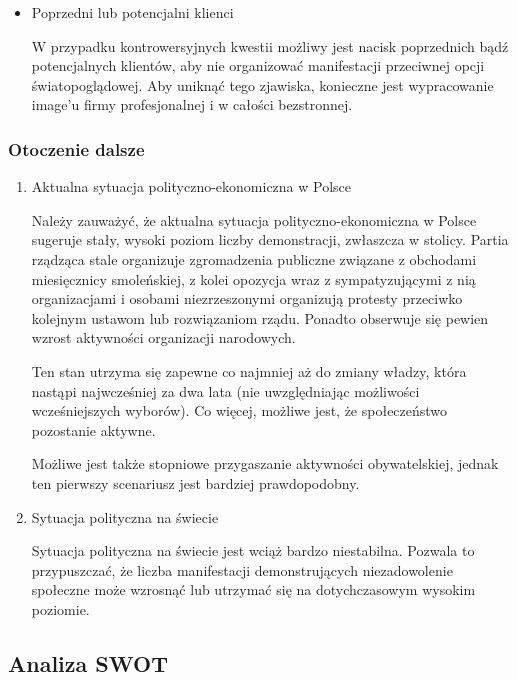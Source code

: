\documentclass{article}
\begin{document}
\begin{enumerate}
\begin{itemize}
	\item Poprzedni lub potencjalni klienci
	
	W przypadku kontrowersyjnych kwestii możliwy jest nacisk poprzednich bądź potencjalnych klientów, aby nie organizować manifestacji przeciwnej opcji światopoglądowej. Aby uniknąć tego zjawiska, konieczne jest wypracowanie image'u firmy profesjonalnej i w całości bezstronnej.
	
	
	\end{itemize}

	
\end{enumerate}



\subsubsection{Otoczenie dalsze} %
\begin{enumerate}
\item Aktualna sytuacja polityczno-ekonomiczna w Polsce

Należy zauważyć, że aktualna sytuacja polityczno-ekonomiczna w Polsce sugeruje stały, wysoki poziom liczby demonstracji, zwłaszcza w stolicy. Partia rządząca stale organizuje zgromadzenia publiczne związane z obchodami miesięcznicy smoleńskiej, z kolei opozycja wraz z sympatyzującymi z nią organizacjami i osobami niezrzeszonymi organizują protesty przeciwko kolejnym ustawom lub rozwiązaniom rządu. Ponadto obserwuje się pewien wzrost aktywności organizacji narodowych.

Ten stan utrzyma się zapewne co najmniej aż do zmiany władzy, która nastąpi najwcześniej za dwa lata (nie uwzględniając możliwości wcześniejszych wyborów). Co więcej, możliwe jest, że społeczeństwo pozostanie aktywne.

Możliwe jest także stopniowe przygaszanie aktywności obywatelskiej, jednak ten pierwszy scenariusz jest bardziej prawdopodobny.

\item Sytuacja polityczna na świecie

Sytuacja polityczna na świecie jest wciąż bardzo niestabilna. Pozwala to przypuszczać, że liczba manifestacji demonstrujących niezadowolenie społeczne może wzrosnąć lub utrzymać się na dotychczasowym wysokim poziomie. 


\end{enumerate}


\subsection{Analiza SWOT}
\end{document}
